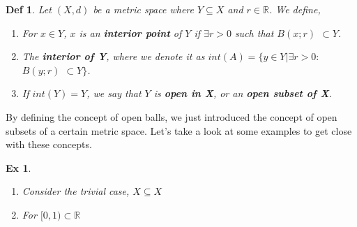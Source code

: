 \documentclass[paper=a4, fontsize=11pt]{scrartcl}
\newcommand{\ball}[2]{$B({#1};{#2})$}
\newtheorem{definition}{Def}
\newtheorem{example}{Ex}
\begin{document}
\begin{definition}
	Let $(X,d)$ be a metric space where $Y \subseteq X$ and $r \in \mathbb{R}$. We define, 
	\begin{enumerate}
		\item For $x \in Y$, $x$ is an \textbf{interior point} of $Y$ if $\exists r > 0$ such that \ball{x}{r} $\subset Y$.
		\item The \textbf{interior of Y}, where we denote it as $int(A)=\{y\in Y | \exists r > 0 :$ \ball{y}{r} $\subset Y \}$.
		\item If $int(Y)=Y$, we say that $Y$ is \textbf{open in X}, or an \textbf{open subset of X}. \\ 
	\end{enumerate}
\end{definition}

By defining the concept of open balls, we just introduced the concept of open subsets of a certain metric space. Let's take a look at some examples to get close with these concepts.\\ 

\begin{example}
$ $\newline
\vspace{-0.15in}
	\begin{enumerate}[label=\arabic*)]
		\item Consider the trivial case, $X \subseteq X $
		\item For $[0,1)\subset\mathbb{R}$
	\end{enumerate}
\end{example}
\end{document}
